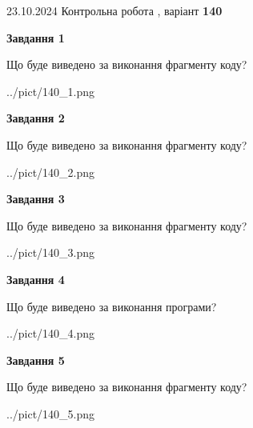 \documentclass[12pt, ukrainian]{article}
\begin{document}
{\Large{23.10.2024 Контрольна робота , варіант  \No \textbf { 140 }\par}}
{
\begin {large}
{\begin {center}\textbf{Завдання 1}\end {center}}

Що буде виведено за виконання фрагменту коду?\par
\begin{center}
	{../pict/140_1.png}
\end{center}
\newpage

{\begin {center}\textbf{Завдання 2}\end {center}}

Що буде виведено за виконання фрагменту коду?\par
\begin{center}
	{../pict/140_2.png}
\end{center}
\newpage

{\begin {center}\textbf{Завдання 3}\end {center}}

Що буде виведено за виконання фрагменту коду?\par
\begin{center}
	{../pict/140_3.png}
\end{center}
\newpage

{\begin {center}\textbf{Завдання 4}\end {center}}

Що буде виведено за виконання програми?\par
\begin{center}
	{../pict/140_4.png}
\end{center}
\newpage

{\begin {center}\textbf{Завдання 5}\end {center}}

Що буде виведено за виконання фрагменту коду?\par
\begin{center}
	{../pict/140_5.png}
\end{center}
\newpage


\end{large}}
\end{document}
